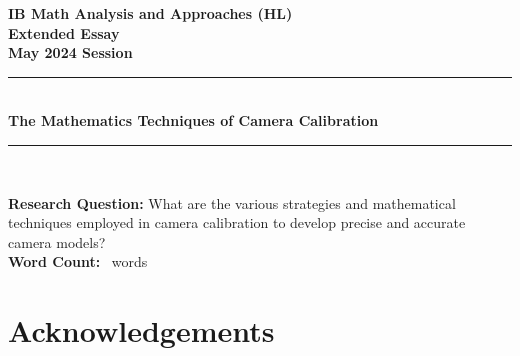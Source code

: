 \documentclass[12pt, oneside]{article}
\begin{document}
\pagestyle{frontmatter}

\begin{titlepage}
    \large

    \begin{center}

        \vspace*{2cm}

        {\bfseries
            IB Math Analysis and Approaches (HL) \\
            Extended Essay\\
            May 2024 Session}\\

        \vspace*{\fill}

        \rule{\linewidth}{1.5pt} \\ [0.5cm]
        {\LARGE \bfseries The Mathematics Techniques of Camera Calibration}
        \rule{\linewidth}{0.5pt} \\

        \vspace*{\fill}

        \textbf{Research Question:} What are the various strategies and mathematical techniques employed in camera calibration to develop precise and accurate camera models?\\ [1cm]

        \textbf{Word Count:} \printwordcount\ words

        \vspace*{2cm}

    \end{center}

\end{titlepage}

\tableofcontents
\clearpage
\pagestyle{mainmatter}
\setcounter{page}{1}









\section*{Acknowledgements}
\end{document}
